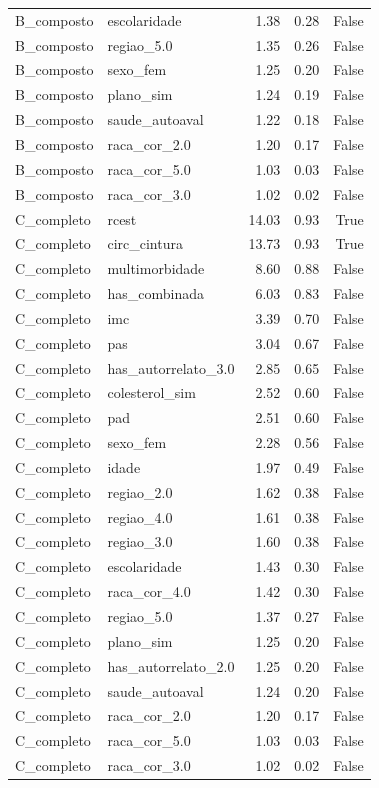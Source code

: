 \begin{tabular}{llrrr}
B_composto & escolaridade & 1.38 & 0.28 & False \\
B_composto & regiao_5.0 & 1.35 & 0.26 & False \\
B_composto & sexo_fem & 1.25 & 0.20 & False \\
B_composto & plano_sim & 1.24 & 0.19 & False \\
B_composto & saude_autoaval & 1.22 & 0.18 & False \\
B_composto & raca_cor_2.0 & 1.20 & 0.17 & False \\
B_composto & raca_cor_5.0 & 1.03 & 0.03 & False \\
B_composto & raca_cor_3.0 & 1.02 & 0.02 & False \\
C_completo & rcest & 14.03 & 0.93 & True \\
C_completo & circ_cintura & 13.73 & 0.93 & True \\
C_completo & multimorbidade & 8.60 & 0.88 & False \\
C_completo & has_combinada & 6.03 & 0.83 & False \\
C_completo & imc & 3.39 & 0.70 & False \\
C_completo & pas & 3.04 & 0.67 & False \\
C_completo & has_autorrelato_3.0 & 2.85 & 0.65 & False \\
C_completo & colesterol_sim & 2.52 & 0.60 & False \\
C_completo & pad & 2.51 & 0.60 & False \\
C_completo & sexo_fem & 2.28 & 0.56 & False \\
C_completo & idade & 1.97 & 0.49 & False \\
C_completo & regiao_2.0 & 1.62 & 0.38 & False \\
C_completo & regiao_4.0 & 1.61 & 0.38 & False \\
C_completo & regiao_3.0 & 1.60 & 0.38 & False \\
C_completo & escolaridade & 1.43 & 0.30 & False \\
C_completo & raca_cor_4.0 & 1.42 & 0.30 & False \\
C_completo & regiao_5.0 & 1.37 & 0.27 & False \\
C_completo & plano_sim & 1.25 & 0.20 & False \\
C_completo & has_autorrelato_2.0 & 1.25 & 0.20 & False \\
C_completo & saude_autoaval & 1.24 & 0.20 & False \\
C_completo & raca_cor_2.0 & 1.20 & 0.17 & False \\
C_completo & raca_cor_5.0 & 1.03 & 0.03 & False \\
C_completo & raca_cor_3.0 & 1.02 & 0.02 & False \\
\bottomrule
\end{tabular}
